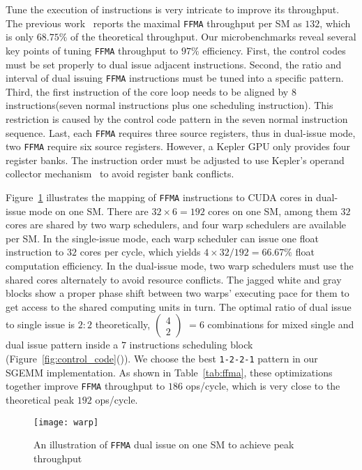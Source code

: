 Tune the execution of instructions is very intricate to improve its throughput. 
The previous work~\cite{lai} reports the maximal {\tt FFMA} throughput per SM as $132$, which is only $68.75\%$ of the theoretical throughput. 
Our microbenchmarks reveal several key points of tuning {\tt FFMA} throughput to $97\%$ efficiency.
First, the control codes must be set properly to dual issue adjacent instructions. 
Second, the ratio and interval of dual issuing {\tt FFMA} instructions must be tuned into a specific pattern.
Third, the first instruction of the core loop needs to be aligned by 8 instructions(seven
normal instructions plus one scheduling instruction). This restriction
is caused by the control code pattern in the seven normal instruction sequence.
Last, each {\tt FFMA} requires three source registers, thus in dual-issue mode, two {\tt FFMA} require six source registers.
However, a Kepler GPU only provides four register banks.
The instruction order must be adjusted to use Kepler's operand collector mechanism~\cite{collector,tarjan2012policy} to avoid register bank conflicts. 

Figure~\ref{fig:warp} illustrates the mapping of {\tt FFMA} instructions to
CUDA cores in dual-issue mode on one SM. There are $32\times 6=192$ cores on
one SM, among them $32$ cores are shared by two warp schedulers, and four warp schedulers are available per SM. 
In the single-issue mode, each warp scheduler can issue one float instruction to $32$ cores per cycle, which yields $4\times32/192=66.67\%$ float computation efficiency. 
In the dual-issue mode, two warp schedulers must use the shared cores alternately to avoid resource conflicts.
The jagged white and gray blocks show a proper phase shift between two warps' executing pace for them to get access to the shared computing units in turn.
The optimal ratio of dual issue to single issue is $2:2$ theoretically, 
\( \begin{pmatrix} 4 \\ 2 \end{pmatrix} \) $=6$ combinations for mixed single and dual issue
pattern inside a $7$ instructions scheduling block (Figure~\ref{fig:control_code}()).
We choose the best {\tt 1-2-2-1} pattern in our SGEMM implementation.
As shown in Table~\ref{tab:ffma}, these optimizations together improve {\tt FFMA} throughput to $186$ ops/cycle, which is very close to the theoretical peak $192$ ops/cycle.
\begin{figure}[htbp]
\begin{center}
\texttt{[image: warp]}
    \caption{\small An illustration of {\tt FFMA} dual issue on one SM to achieve peak throughput}
\label{fig:warp}
\end{center}
\end{figure}

